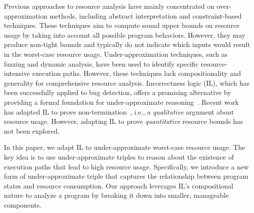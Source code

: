 Previous approaches to resource analysis have mainly concentrated on over-approximation methods, including abstract interpretation and constraint-based techniques.
%
These techniques aim to compute sound upper bounds on resource usage by taking into account all possible program behaviors.
%
However, they may produce non-tight bounds and typically do not indicate which inputs would result in the worst-case resource usage.
%
Under-approximation techniques, such as fuzzing and dynamic analysis, have been used to identify specific resource-intensive execution paths.
%
However, these techniques lack compositionality and generality for comprehensive resource analysis.
%
Incorrectness logic (IL), which has been successfully applied to bug detection, offers a promising alternative by providing a formal foundation for under-approximate reasoning~\cite{POPL:OHearn20}.
%
Recent work has adapted IL to prove non-termination~\cite{OOPSLA:RVO24}, i.e., a \emph{qualitative} argument about resource usage.
%
However, adapting IL to prove \emph{quantitative} resource bounds has not been explored.

In this paper, we adapt IL to under-approximate worst-case resource usage.
%
The key idea is to use under-approximate triples to reason about the existence of execution paths that lead to high resource usage.
%
Specifically, we introduce a new form of under-approximate triple that captures the relationship between program states and resource consumption.
%
Our approach leverages IL's compositional nature to analyze a program by breaking it down into smaller, manageable components.

